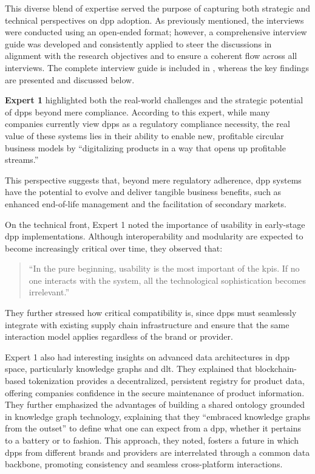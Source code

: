 This diverse blend of expertise served the purpose of capturing both strategic and technical perspectives on \ac{dpp} adoption. As previously mentioned, the interviews were conducted using an open-ended format; however, a comprehensive interview guide was developed and consistently applied to steer the discussions in alignment with the research objectives and to ensure a coherent flow across all interviews. The complete interview guide is included in , whereas the key findings are presented and discussed below.

\textbf{Expert 1} highlighted both the real-world challenges and the strategic potential of \ac{dpp}s beyond mere compliance. According to this expert, while many companies currently view \ac{dpp}s as a regulatory compliance necessity, the real value of these systems lies in their ability to enable new, profitable circular business models by ``digitalizing products in a way that opens up profitable streams.''

This perspective suggests that, beyond mere regulatory adherence, \ac{dpp} systems have the potential to evolve and deliver tangible business benefits, such as enhanced end-of-life management and the facilitation of secondary markets.

On the technical front, Expert 1 noted the importance of usability in early-stage \ac{dpp} implementations. Although interoperability and modularity are expected to become increasingly critical over time, they observed that:

\begin{quote}
    ``In the pure beginning, usability is the most important of the \ac{kpi}s. If no one interacts with the system, all the technological sophistication becomes irrelevant.''
\end{quote}

They further stressed how critical compatibility is, since \ac{dpp}s must seamlessly integrate with existing supply chain infrastructure and ensure that the same interaction model applies regardless of the brand or provider.

Expert 1 also had interesting insights on advanced data architectures in \ac{dpp} space, particularly knowledge graphs and \acrlong{dlt}. They explained that blockchain-based tokenization provides a decentralized, persistent registry for product data, offering companies confidence in the secure maintenance of product information. They further emphasized  the advantages of building a shared ontology grounded in knowledge graph technology, explaining that they ``embraced knowledge graphs from the outset'' to define what one can expect from a \ac{dpp}, whether it pertains to a battery or to fashion. This approach, they noted, fosters a future in which \ac{dpp}s from different brands and providers are interrelated through a common data backbone, promoting consistency and seamless cross-platform interactions.

